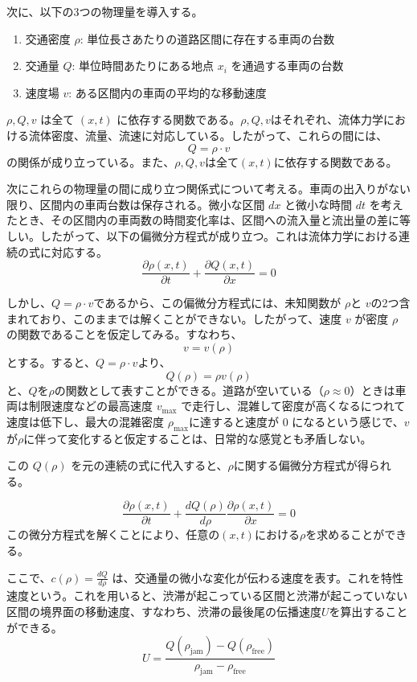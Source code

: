 \documentclass[11pt,a4paper,twocolumn]{jsarticle}
\begin{document}
次に、以下の3つの物理量を導入する。
\begin{enumerate}
\item 交通密度 $\rho$: 単位長さあたりの道路区間に存在する車両の台数
\item 交通量 $Q$: 単位時間あたりにある地点 $x_i$ を通過する車両の台数
\item 速度場 $v$: ある区間内の車両の平均的な移動速度
\end{enumerate}

$\rho, Q, v$ は全て $(x, t)$ に依存する関数である。$\rho, Q, v$はそれぞれ、流体力学における流体密度、流量、流速に対応している。したがって、これらの間には、
\[Q=\rho \cdot v\]
の関係が成り立っている。また、$\rho, Q, v$は全て$(x,t)$に依存する関数である。

次にこれらの物理量の間に成り立つ関係式について考える。車両の出入りがない限り、区間内の車両台数は保存される。微小な区間 $dx$ と微小な時間 $dt$ を考えたとき、その区間内の車両数の時間変化率は、区間への流入量と流出量の差に等しい。したがって、以下の偏微分方程式が成り立つ。これは流体力学における連続の式に対応する。
\[\frac{\partial \rho(x,t)}{\partial t} + \frac{\partial Q(x,t)}{\partial x} = 0\]

しかし、$Q=\rho \cdot v$であるから、この偏微分方程式には、未知関数が $\rho$と $v$の2つ含まれており、このままでは解くことができない。したがって、速度 $v$ が密度 $\rho$ の関数であることを仮定してみる。すなわち、
\[v = v(\rho)\]
とする。すると、$Q=\rho \cdot v$より、
\[Q(\rho)=\rho v(\rho)\]
と、$Q$を$\rho$の関数として表すことができる。道路が空いている（$\rho \approx 0$）ときは車両は制限速度などの最高速度 $v_{\mathrm{max}}$ で走行し、混雑して密度が高くなるにつれて速度は低下し、最大の混雑密度 $\rho_{\mathrm{max}}$に達すると速度が $0$ になるという感じで、$v$が$\rho$に伴って変化すると仮定することは、日常的な感覚とも矛盾しない。

この $Q(\rho)$ を元の連続の式に代入すると、$\rho$に関する偏微分方程式が得られる。

\[\frac{\partial \rho(x,t)}{\partial t} + \frac{dQ(\rho)}{d\rho} \frac{\partial \rho(x,t)}{\partial x} = 0\]
この微分方程式を解くことにより、任意の$(x,t)$における$\rho$を求めることができる。

ここで、$c(\rho) = \frac{dQ}{d\rho}$ は、交通量の微小な変化が伝わる速度を表す。これを特性速度という。これを用いると、渋滞が起こっている区間と渋滞が起こっていない区間の境界面の移動速度、すなわち、渋滞の最後尾の伝播速度$U$を算出することができる。
\[U=\frac{Q(\rho_{\mathrm{jam}})-Q(\rho_{\mathrm{free}})}{\rho_{\mathrm{jam}}-\rho_{\mathrm{free}}}\]
\end{document}
